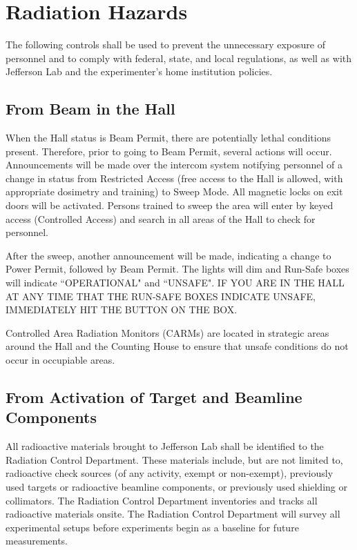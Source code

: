 \documentclass [12pt]{article}
\begin{document}
\section{Radiation Hazards}
\indent

The following controls shall be used to prevent the unnecessary exposure of personnel and to 
comply with federal, state, and local regulations, as well as with Jefferson Lab and the 
experimenter's home institution policies. 

\subsection{From Beam in the Hall}

When the Hall status is Beam Permit, there are potentially lethal conditions present. Therefore, 
prior to going to Beam Permit, several actions will occur. Announcements will be made over the 
intercom system notifying personnel of a change in status from Restricted Access (free access 
to the Hall is allowed, with appropriate dosimetry and training) to Sweep Mode. All magnetic 
locks on exit doors will be activated. Persons trained to sweep the area will enter by keyed
access (Controlled Access) and search in all areas of the Hall to check for personnel. 

After the sweep, another announcement will be made, indicating a change to Power Permit, followed 
by Beam Permit. The lights will dim and Run-Safe boxes will indicate ``OPERATIONAL" and ``UNSAFE". 
IF YOU ARE IN THE HALL AT ANY TIME THAT THE RUN-SAFE BOXES INDICATE UNSAFE, IMMEDIATELY HIT THE 
BUTTON ON THE BOX. 

Controlled Area Radiation Monitors (CARMs) are located in strategic areas around the Hall and the 
Counting House to ensure that unsafe conditions do not occur in occupiable areas. 

\subsection{From Activation of Target and Beamline Components}

All radioactive materials brought to Jefferson Lab shall be identified to the Radiation Control 
Department. These materials include, but are not limited to, radioactive check sources (of any 
activity, exempt or non-exempt), previously used targets or radioactive beamline components, or 
previously used shielding or collimators. The Radiation Control Department inventories and tracks 
all radioactive materials onsite. The Radiation Control Department will survey all experimental 
setups before experiments begin as a baseline for future measurements. 
\end{document}
